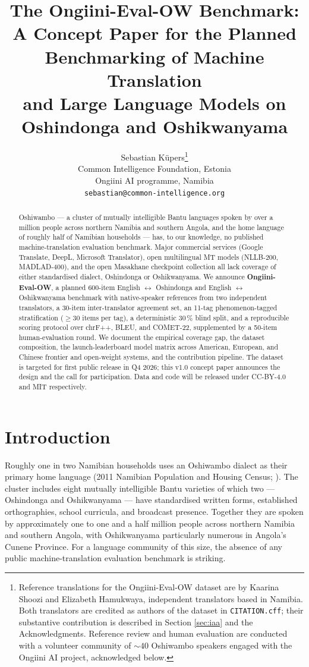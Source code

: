 \documentclass[11pt]{article}
\title{The Ongiini-Eval-OW Benchmark: \\
A Concept Paper for the Planned Benchmarking of Machine Translation \\
and Large Language Models on Oshindonga and Oshikwanyama}
\author{Sebastian K\"upers\thanks{Reference translations for the
Ongiini-Eval-OW dataset are by Kaarina Shoozi and Elizabeth
Hamukwaya, independent translators based in Namibia. Both
translators are credited as authors of the dataset in
\texttt{CITATION.cff}; their substantive contribution is described
in Section \ref{sec:iaa} and the Acknowledgments. Reference review
and human evaluation are conducted with a volunteer community of
$\sim 40$ Oshiwambo speakers engaged with the Ongiini AI project,
acknowledged below.} \\
  Common Intelligence Foundation, Estonia \\
  Ongiini AI programme, Namibia \\
  \texttt{sebastian@common-intelligence.org}}
\begin{document}
\maketitle

\begin{abstract}
Oshiwambo --- a cluster of mutually intelligible Bantu languages
spoken by over a million people across northern Namibia and
southern Angola, and the home language of roughly half of Namibian
households --- has, to our knowledge, no published
machine-translation evaluation benchmark. Major commercial services
(Google Translate, DeepL, Microsoft Translator), open multilingual
MT models (NLLB-200, MADLAD-400), and the open Masakhane checkpoint
collection all lack coverage of either standardised dialect,
Oshindonga or Oshikwanyama. We announce \textbf{Ongiini-Eval-OW}, a
planned 600-item English $\leftrightarrow$ Oshindonga and English
$\leftrightarrow$ Oshikwanyama benchmark with native-speaker
references from two independent translators, a 30-item
inter-translator agreement set, an 11-tag phenomenon-tagged
stratification ($\geq 30$ items per tag), a deterministic 30\,\%
blind split, and a reproducible scoring protocol over chrF++,
BLEU, and COMET-22, supplemented by a 50-item human-evaluation
round. We document the empirical coverage gap, the dataset
composition, the launch-leaderboard model matrix across American,
European, and Chinese frontier and open-weight systems, and the
contribution pipeline. The dataset is targeted for first public
release in Q4 2026; this v1.0 concept paper announces the design
and the call for participation. Data and code will be released
under CC-BY-4.0 and MIT respectively.
\end{abstract}

\section{Introduction}
\label{sec:intro}

Roughly one in two Namibian households uses an Oshiwambo dialect as
their primary home language (2011 Namibian Population and Housing
Census; \citealp{nsa2024census}). The cluster includes eight
mutually intelligible Bantu varieties of which two --- Oshindonga
and Oshikwanyama --- have standardised written forms, established
orthographies, school curricula, and broadcast presence. Together
they are spoken by approximately one to one and a half million
people across northern Namibia and southern Angola, with
Oshikwanyama particularly numerous in Angola's Cunene Province.
For a language community of this size, the absence of any public
machine-translation evaluation benchmark is striking.
\end{document}
